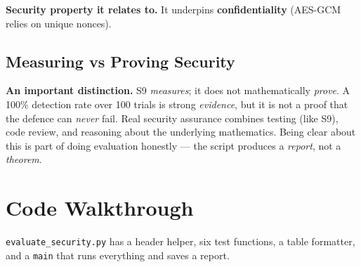 \documentclass[11pt,a4paper]{report}
\begin{document}
\textbf{Security property it relates to.} It underpins \textbf{confidentiality}
(AES-GCM relies on unique nonces).

\subsection{Measuring vs Proving Security}
\textbf{An important distinction.} S9 \emph{measures}; it does not mathematically
\emph{prove}. A 100\% detection rate over 100 trials is strong \emph{evidence},
but it is not a proof that the defence can \emph{never} fail. Real security
assurance combines testing (like S9), code review, and reasoning about the
underlying mathematics. Being clear about this is part of doing evaluation
honestly --- the script produces a \emph{report}, not a \emph{theorem}.

\section{Code Walkthrough}

\texttt{evaluate\_security.py} has a header helper, six test functions, a table
formatter, and a \texttt{main} that runs everything and saves a report.
\end{document}
